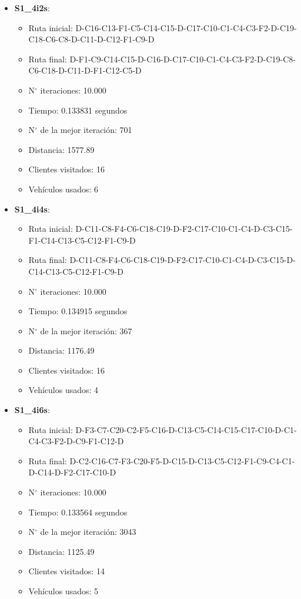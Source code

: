 \documentclass[letter, 10pt]{article}
\begin{document}
\begin{itemize}
\item \textbf{S1\_4i2s}:

	\begin{itemize}
	\item Ruta inicial: D-C16-C13-F1-C5-C14-C15-D-C17-C10-C1-C4-C3-F2-D-C19-C18-C6-C8-D-C11-D-C12-F1-C9-D
	\item Ruta final: D-F1-C9-C14-C15-D-C16-D-C17-C10-C1-C4-C3-F2-D-C19-C8-C6-C18-D-C11-D-F1-C12-C5-D
	\item N\(^\circ\) iteraciones: 10.000
	\item Tiempo: 0.133831 segundos
	\item N\(^\circ\) de la mejor iteración: 701
	\item Distancia: 1577.89
	\item Clientes visitados: 16
	\item Vehículos usados: 6
	\end{itemize}
	
\item \textbf{S1\_4i4s}:

	\begin{itemize}
	\item Ruta inicial: D-C11-C8-F4-C6-C18-C19-D-F2-C17-C10-C1-C4-D-C3-C15-F1-C14-C13-C5-C12-F1-C9-D
	\item Ruta final: D-C11-C8-F4-C6-C18-C19-D-F2-C17-C10-C1-C4-D-C3-C15-D-C14-C13-C5-C12-F1-C9-D
	\item N\(^\circ\) iteraciones: 10.000
	\item Tiempo: 0.134915 segundos
	\item N\(^\circ\) de la mejor iteración: 367
	\item Distancia: 1176.49
	\item Clientes visitados: 16
	\item Vehículos usados: 4
	\end{itemize}

\item \textbf{S1\_4i6s}:

	\begin{itemize}
	\item Ruta inicial: D-F3-C7-C20-C2-F5-C16-D-C13-C5-C14-C15-C17-C10-D-C1-C4-C3-F2-D-C9-F1-C12-D
	\item Ruta final: D-C2-C16-C7-F3-C20-F5-D-C15-D-C13-C5-C12-F1-C9-C4-C1-D-C14-D-F2-C17-C10-D
	\item N\(^\circ\) iteraciones: 10.000
	\item Tiempo: 0.133564 segundos
	\item N\(^\circ\) de la mejor iteración: 3043
	\item Distancia: 1125.49
	\item Clientes visitados: 14
	\item Vehículos usados: 5
	\end{itemize}


\end{itemize}
\end{document}
